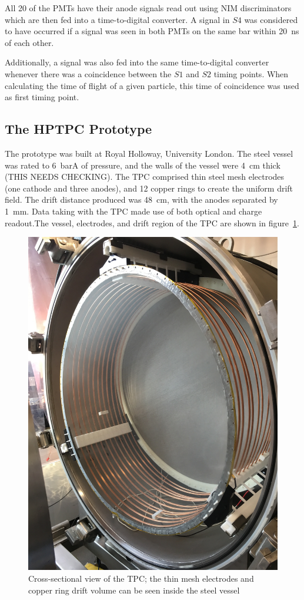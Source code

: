 All 20 of the PMTs have their anode signals read out using NIM discriminators which are then fed into a time-to-digital converter. A signal in $S4$ was considered to have occurred if a signal was seen in both PMTs on the same bar within 20~ns of each other. 

Additionally, a signal was also fed into the same time-to-digital converter whenever there was a coincidence between the $S1$ and $S2$ timing points. When calculating the time of flight of a given particle, this time of coincidence was used as first timing point.

\subsection{The HPTPC Prototype}
The prototype was built at Royal Holloway, University London.  The steel vessel was rated to 6~barA of pressure, and the walls of the vessel were 4~cm thick (THIS NEEDS CHECKING).
The TPC comprised thin steel mesh electrodes (one cathode and three anodes), and 12 copper rings to create the uniform drift field. The drift distance produced was 48~cm, with the anodes separated by 1~mm. Data taking with the TPC made use of both optical and charge readout.The vessel, electrodes, and drift region of the TPC are shown in figure~\ref{fig:TPC}.
    
     \begin{figure}
      \centering
    \includegraphics[width=0.6\linewidth]{files/Figures/IMG_1194.jpg}
    	\caption{Cross-sectional view of the TPC; the thin mesh electrodes and copper ring drift volume can be seen inside the steel vessel}
    		\label{fig:TPC}
    \end{figure}
    
